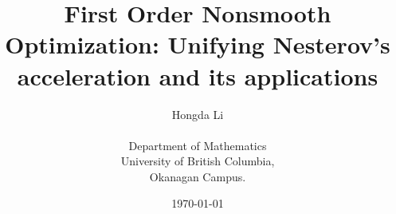 \documentclass[12pt]{article}
\title{
    {
        \fontfamily{ptm}\selectfont 
        First Order Nonsmooth Optimization: 
        Unifying Nesterov's acceleration and its applications
    }
}
\author{
    Hongda Li\\[3ex]\\ Department of Mathematics\\
	University of British Columbia,\\
	Okanagan Campus.
}
\date{\today}
\begin{document}

\maketitle
\tableofcontents
\pagebreak





\end{document}
